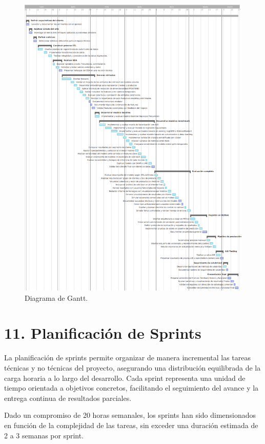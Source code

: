 \documentclass[
11pt, %
]{charter}
\begin{document}
\begin{figure}[htpb]
\centering 
\includegraphics[height=.95\textheight]{./Figuras/Gantt.png}
\caption{Diagrama de Gantt.} 
\label{fig:diagGantt}
\end{figure}

\section{11. Planificación de Sprints}

La planificación de sprints permite organizar de manera incremental las tareas técnicas y no técnicas del proyecto, asegurando una distribución equilibrada de la carga horaria a lo largo del desarrollo. Cada sprint representa una unidad de tiempo orientada a objetivos concretos, facilitando el seguimiento del avance y la entrega continua de resultados parciales.

Dado un compromiso de 20 horas semanales, los sprints han sido dimensionados en función de la complejidad de las tareas, sin exceder una duración estimada de 2 a 3 semanas por sprint.
\end{document}
